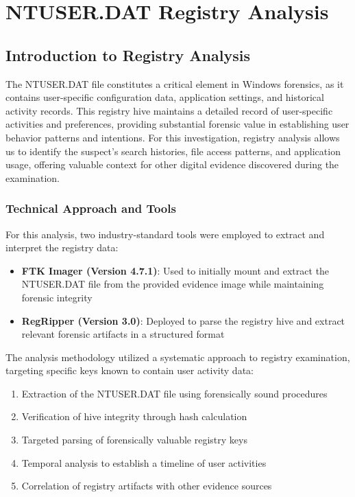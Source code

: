 \chapter{NTUSER.DAT Registry Analysis}

\section{Introduction to Registry Analysis}
The NTUSER.DAT file constitutes a critical element in Windows forensics, as it contains user-specific configuration data, application settings, and historical activity records. This registry hive maintains a detailed record of user-specific activities and preferences, providing substantial forensic value in establishing user behavior patterns and intentions. For this investigation, registry analysis allows us to identify the suspect's search histories, file access patterns, and application usage, offering valuable context for other digital evidence discovered during the examination.

\subsection{Technical Approach and Tools}
For this analysis, two industry-standard tools were employed to extract and interpret the registry data:

\begin{itemize}
    \item \textbf{FTK Imager (Version 4.7.1)}: Used to initially mount and extract the NTUSER.DAT file from the provided evidence image while maintaining forensic integrity
    \item \textbf{RegRipper (Version 3.0)}: Deployed to parse the registry hive and extract relevant forensic artifacts in a structured format
\end{itemize}

The analysis methodology utilized a systematic approach to registry examination, targeting specific keys known to contain user activity data:

\begin{enumerate}
    \item Extraction of the NTUSER.DAT file using forensically sound procedures
    \item Verification of hive integrity through hash calculation
    \item Targeted parsing of forensically valuable registry keys
    \item Temporal analysis to establish a timeline of user activities
    \item Correlation of registry artifacts with other evidence sources
\end{enumerate}

